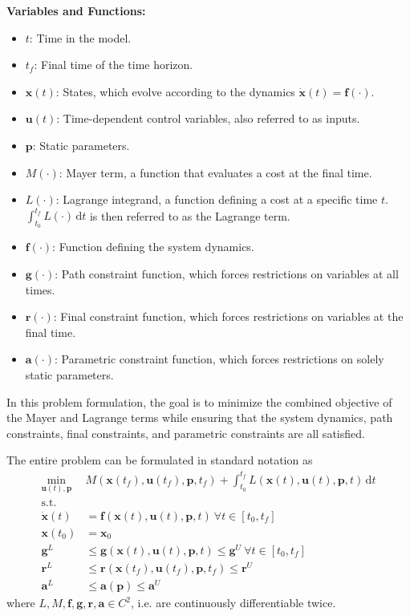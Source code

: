 \documentclass[12pt]{article}
\newcommand{\dd}{\mathrm{d}}
\renewcommand{\v}{\bm}
\begin{document}
\noindent
\textbf{Variables and Functions:}
\begin{itemize}
	\item $t$: Time in the model.
	\item $t_f$: Final time of the time horizon.
	\item $\v{x}(t)$: States, which evolve according to the dynamics $\dot{\v{x}}(t) = \v{f}(\cdot)$.
	\item $\v{u}(t)$: Time-dependent control variables, also referred to as inputs.
	\item $\v{p}$: Static parameters.
	\item $M(\cdot)$: Mayer term, a function that evaluates a cost at the final time.
	\item $L(\cdot)$: Lagrange integrand, a function defining a cost at a specific time $t$. $\int_{t_0}^{t_f} L(\cdot) \, \dd t$ is then referred to as the Lagrange term.
	\item $\v{f}(\cdot)$: Function defining the system dynamics.
	\item $\v{g}(\cdot)$: Path constraint function, which forces restrictions on variables at all times.
	\item $\v{r}(\cdot)$: Final constraint function, which forces restrictions on variables at the final time.
	\item $\v{a}(\cdot)$: Parametric constraint function, which forces restrictions on solely static parameters.
\end{itemize}

In this problem formulation, the goal is to minimize the combined objective of the Mayer and Lagrange terms while ensuring that the system dynamics, path constraints, final constraints, and parametric constraints are all satisfied.

The entire problem can be formulated in standard notation as
\begin{align*}
	\min_{\v{u}(t), \v{p}} ~ & M(\v{x}(t_f), \v{u}(t_f),
	\v{p}, t_f) + \int_{t_0}^{t_f} L(\v{x}(t), \v{u}(t), \v{p}, t)
	\, \mathrm{d}t
	\\
	\text{s.t.}              &
	\\
	\dot{\v{x}}(t)           & = \v{f}(\v{x}(t), \v{u}(t), \v{p},
	t)\
	\forall t \in [t_0, t_f]
	\\
	\v{x}(t_0)               & = \v{x}_0
	\\
	\v{g}^{L}                & \leq \v{g}(\v{x}(t), \v{u}(t),
	\v{p}, t)
	\leq \v{g}^{U}\ \forall t \in [t_0, t_f]
	\\
	\v{r}^{L}                & \leq \v{r}(\v{x}(t_f), \v{u}(t_f),
	\v{p},
	t_f) \leq \v{r}^{U}
	\\
	\v{a}^{L}                & \leq \v{a}(\v{p}) \leq \v{a}^{U}
\end{align*}
where $L, M, \v{f}, \v{g}, \v{r}, \v{a} \in C^2$, i.e. are continuously differentiable twice.
\end{document}
